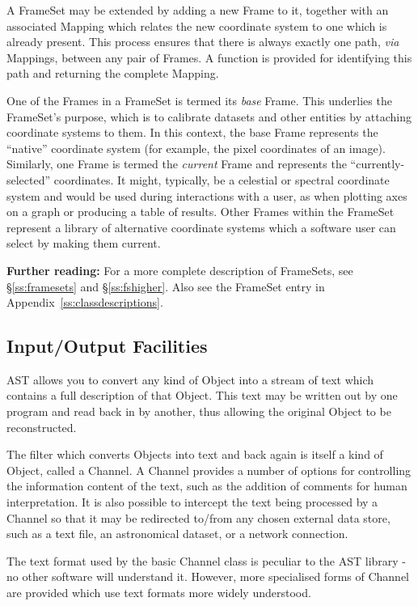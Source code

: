\documentclass[twoside,11pt]{starlink}
\providecommand{\appref}[1]{Appendix~\ref{#1}}
\providecommand{\secref}[1]{\S\ref{#1}}
\begin{document}
A FrameSet may be extended by adding a new Frame to it, together with
an associated Mapping which relates the new coordinate system to one
which is already present.  This process ensures that there is always
exactly one path, \emph{via} Mappings, between any pair of Frames.  A
function is provided for identifying this path and returning the
complete Mapping.

One of the Frames in a FrameSet is termed its \emph{base} Frame.  This
underlies the FrameSet's purpose, which is to calibrate datasets and
other entities by attaching coordinate systems to them.  In this
context, the base Frame represents the ``native'' coordinate system
(for example, the pixel coordinates of an image).  Similarly, one
Frame is termed the \emph{current} Frame and represents the
``currently-selected'' coordinates.  It might, typically, be a
celestial or spectral coordinate system and would be used during
interactions with
a user, as when plotting axes on a graph or producing a table of
results.  Other Frames within the FrameSet represent a library of
alternative coordinate systems which a software user can select by
making them current.

\textbf{Further reading:} For a more complete description of
FrameSets, see \secref{ss:framesets} and \secref{ss:fshigher}. Also
see the FrameSet entry in \appref{ss:classdescriptions}.

\subsection{Input/Output Facilities}

AST allows you to convert any kind of Object into a stream of text
which contains a full description of that Object. This text may be
written out by one program and read back in by another, thus allowing
the original Object to be reconstructed.

The filter which converts Objects into text and back again is itself a
kind of Object, called a Channel. A Channel provides a number of
options for controlling the information content of the text, such as
the addition of comments for human interpretation.  It is also
possible to intercept the text being processed by a Channel so that it
may be redirected to/from any chosen external data store, such as a
text file, an astronomical dataset, or a network connection.

The text format used by the basic Channel class is peculiar to the AST
library - no other software will understand it. However, more specialised
forms of Channel are provided which use text formats more widely
understood.
\end{document}
